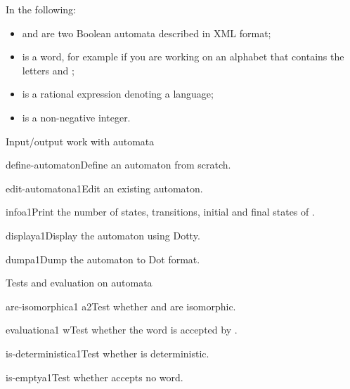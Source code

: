 \smallskip

In the following:
\begin{itemize}
\item {} and  are two Boolean automata described
  in \Vauc XML format;
\item {} is a word, for example  if you are
  working on an alphabet that contains the letters  and
  ;
\item {} is a rational expression denoting a language;
\item {} is a non-negative integer.
\end{itemize}


\begin{fnsection}{Input/output work with automata}
\item{define-automaton}{}{Define an automaton from scratch.}
\item{edit-automaton}{a1}{Edit an existing automaton.}
\item{info}{a1}{Print the number of states, transitions, initial and
    final states of .}
\item{display}{a1}{Display the automaton using Dotty.}
\item{dump}{a1}{Dump the automaton to Dot format.}  \hline
\end{fnsection}

\begin{fnsection}{Tests and evaluation on automata}
\item{are-isomorphic}{a1 a2}{Test whether  and  are
    isomorphic.}
\item{evaluation}{a1 w}{Test whether the word  is accepted by
    .}
\item{is-deterministic}{a1}{Test whether  is deterministic.}
\item{is-empty}{a1}{Test whether  accepts no word.}  \hline
\end{fnsection}

